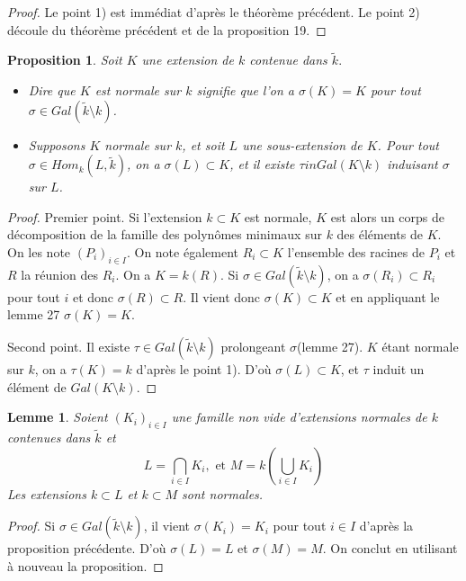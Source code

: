 \documentclass[12pt,a4paper]{report}
\newtheorem{lem}[thm]{\bf Lemme}
\newtheorem{prop}[thm]{\bf Proposition}
\begin{document}
\begin{proof}
Le point 1) est immédiat d'après le théorème précédent. Le point 2) découle du théorème précédent et de la proposition 19.  
\end{proof}

\begin{prop}
Soit $K$ une extension de $k$ contenue dans $\tilde{k}.$
\begin{itemize}
\item Dire que $K$ est normale sur $k$ signifie que l'on a $\sigma(K)=K$ pour tout $\sigma \in Gal(\tilde{k}\setminus k)$. 
\item Supposons $K$ normale sur $k$, et soit $L$ une sous-extension de $K$. Pour tout $\sigma \in Hom_k(L,\tilde{k})$, on a $\sigma(L)\subset K$, et il existe $\tau in  Gal(K\setminus k)$ induisant $\sigma$ sur $L$. 

\end{itemize}

\end{prop}

\begin{proof}
Premier point. Si l'extension $k\subset K$ est normale, $K$ est alors un corps de décomposition de la famille des polynômes minimaux sur $k$ des éléments de $K$. On les note $(P_i)_{i\in I}$. On note également $R_i\subset K$ l'ensemble des racines de $P_i$ et $R$ la réunion des $R_i$. On a $K=k(R)$. Si $\sigma \in Gal(\tilde{k}\setminus k)$, on a $\sigma(R_i)\subset R_i$ pour tout $i$ et donc $\sigma(R)\subset R$. Il vient donc $\sigma(K)\subset K$ et en appliquant le lemme 27  $\sigma(K)= K$. 

Second point. Il existe $\tau \in Gal(\tilde{k}\setminus k)$ prolongeant $\sigma$(lemme 27). $K$ étant normale sur $k$, on a $\tau(K)=k$ d'après le point 1). D'où $\sigma(L)\subset K$, et $\tau$ induit un élément de $Gal(K\setminus k)$. 
\end{proof}

\begin{lem}\rm
Soient $(K_i)_{i\in I}$ une famille non vide d'extensions normales de $k$ contenues dans $\tilde{k}$ et 
$$L=\bigcap_{i\in I} K_i, \text{ et  } M=k \left(\bigcup_{i \in I}K_i\right)$$
Les extensions $k\subset L $ et $k\subset M$ sont normales. 
\end{lem}
\begin{proof}
Si $\sigma \in Gal(\tilde{k}\setminus k)$, il vient $\sigma(K_i)=K_i$ pour tout $i\in I$ d'après la proposition précédente. D'où $\sigma(L)=L$ et $\sigma(M)=M$. On conclut en utilisant à nouveau la proposition. 
\end{proof}
\end{document}
